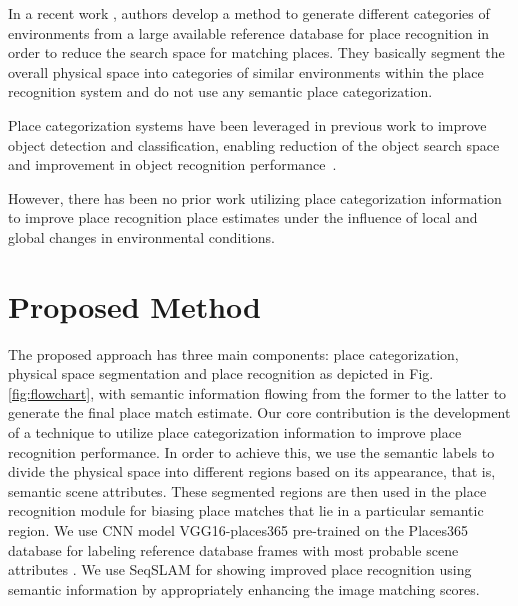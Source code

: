 \documentclass[letterpaper, 10 pt, conference]{ieeeconf}  %
\begin{document}
In a recent work \cite{mohan2015environment}, authors develop a method to generate different categories of environments from a large available reference database for place recognition in order to reduce the search space for matching places. They basically segment the overall physical space into categories of similar environments within the place recognition system and do not use any semantic place categorization.

Place categorization systems have been leveraged in previous work to improve object detection and classification, enabling reduction of the object search space and improvement in object recognition performance~\cite{torralba2003context}. 

However, there has been no prior work utilizing place categorization information to improve place recognition place estimates under the influence of local and global changes in environmental conditions. 



\section{Proposed Method}
The proposed approach has three main components: place categorization, physical space segmentation and place recognition as depicted in Fig. \ref{fig:flowchart}, with semantic information flowing from the former to the latter to generate the final place match estimate. Our core contribution is the development of a technique to utilize place categorization information to improve place recognition performance. In order to achieve this, we use the semantic labels to divide the physical space into different regions based on its appearance, that is, semantic scene attributes. These segmented regions are then used in the place recognition module for biasing place matches that lie in a particular semantic region. We use CNN model VGG16-places365 \cite{cnnPlaces365Github} pre-trained on the Places365 database \cite{zhou2014learning} for labeling reference database frames with most probable scene attributes \cite{Patterson2012SunAttributes}. We use SeqSLAM \cite{Milford2012} for showing improved place recognition using semantic information by appropriately enhancing the image matching scores.
\end{document}
